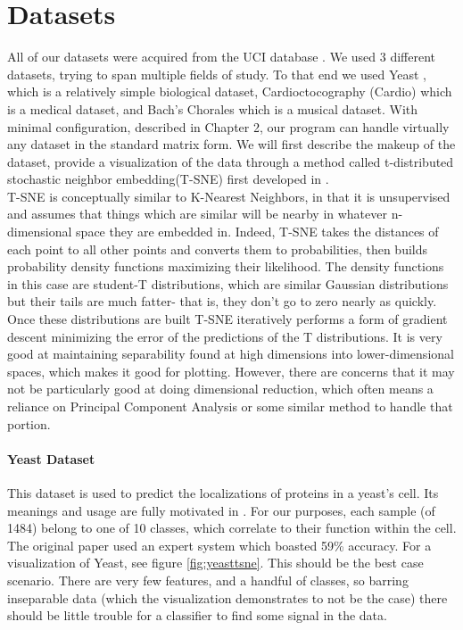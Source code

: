 \section{Datasets}
All of our datasets were acquired from the UCI database \citep{lichman_uci_2013}.  We used 3 different datasets, trying to span multiple fields of study.  To that end we used Yeast \citep{paul_horton_uci_1996}, which is a relatively simple biological dataset, Cardioctocography \citep{j._p._marques_de_sa_uci_2010} (Cardio) which is a medical dataset, and Bach's Chorales \citep{daniele_p._radicioni_uci_2014} which is a musical dataset.  With minimal configuration, described in Chapter 2, our program can handle virtually any dataset in the standard matrix form.  We will first describe the makeup of the dataset, provide a visualization of the data through a method called t-distributed stochastic neighbor embedding(T-SNE) first developed in \cite{maaten_visualizing_2008}.\\
T-SNE is conceptually similar to K-Nearest Neighbors, in that it is unsupervised and assumes that things which are similar will be nearby in whatever n-dimensional space they are embedded in.  Indeed, T-SNE takes the distances of each point to all other points and converts them to probabilities, then builds probability density functions maximizing their likelihood.  The density functions in this case are student-T distributions, which are similar Gaussian distributions but their tails are much fatter- that is, they don't go to zero nearly as quickly.  Once these distributions are built T-SNE iteratively performs a form of gradient descent minimizing the error of the predictions of the T distributions.  It is very good at maintaining separability found at high dimensions into lower-dimensional spaces, which makes it good for plotting. However, there are concerns that it may not be particularly good at doing dimensional reduction, which often means a reliance on Principal Component Analysis or some similar method to handle that portion.\\
\paragraph{Yeast Dataset}
This dataset is used to predict the localizations of proteins in a yeast's cell.  Its meanings and usage are fully motivated in \cite{nakai_knowledge_1992}.  For our purposes, each sample (of 1484) belong to one of 10 classes, which correlate to their function within the cell.  The original paper used an expert system which boasted 59\% accuracy.  For a visualization of Yeast, see figure \ref{fig:yeasttsne}.  This should be the best case scenario.  There are very few features, and a handful of classes, so barring inseparable data (which the visualization demonstrates to not be the case) there should be little trouble for a classifier to find some signal in the data.


